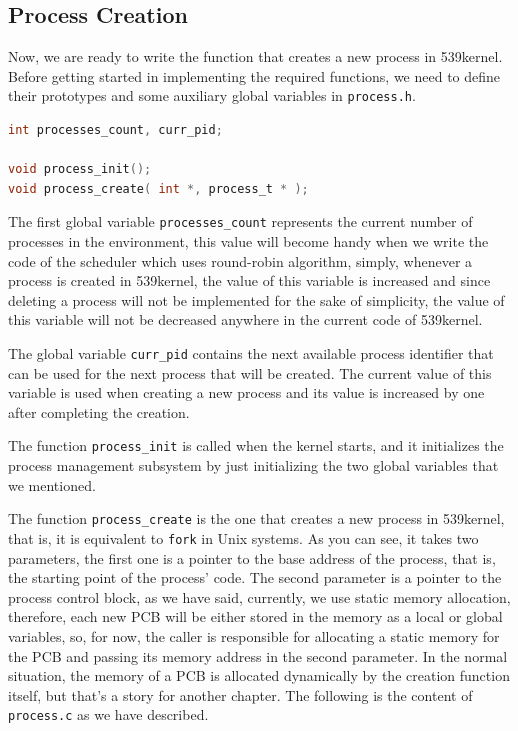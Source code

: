 \subsection{Process Creation}\label{process-creation}

Now, we are ready to write the function that creates a new process in
539kernel. Before getting started in implementing the required
functions, we need to define their prototypes and some auxiliary global
variables in \lstinline!process.h!.

\begin{lstlisting}[language=C]
int processes_count, curr_pid;

void process_init();
void process_create( int *, process_t * );
\end{lstlisting}

The first global variable \lstinline!processes_count! represents the
current number of processes in the environment, this value will become
handy when we write the code of the scheduler which uses round-robin
algorithm, simply, whenever a process is created in 539kernel, the value
of this variable is increased and since deleting a process will not be
implemented for the sake of simplicity, the value of this variable will
not be decreased anywhere in the current code of 539kernel.

The global variable \lstinline!curr_pid! contains the next available
process identifier that can be used for the next process that will be
created. The current value of this variable is used when creating a new
process and its value is increased by one after completing the creation.

The function \lstinline!process_init! is called when the kernel starts,
and it initializes the process management subsystem by just initializing
the two global variables that we mentioned.

The function \lstinline!process_create! is the one that creates a new
process in 539kernel, that is, it is equivalent to \lstinline!fork! in
Unix systems. As you can see, it takes two parameters, the first one is
a pointer to the base address of the process, that is, the starting
point of the process' code. The second parameter is a pointer to the
process control block, as we have said, currently, we use static memory
allocation, therefore, each new PCB will be either stored in the memory
as a local or global variables, so, for now, the caller is responsible
for allocating a static memory for the PCB and passing its memory
address in the second parameter. In the normal situation, the memory of
a PCB is allocated dynamically by the creation function itself, but
that's a story for another chapter. The following is the content of
\lstinline!process.c! as we have described.

